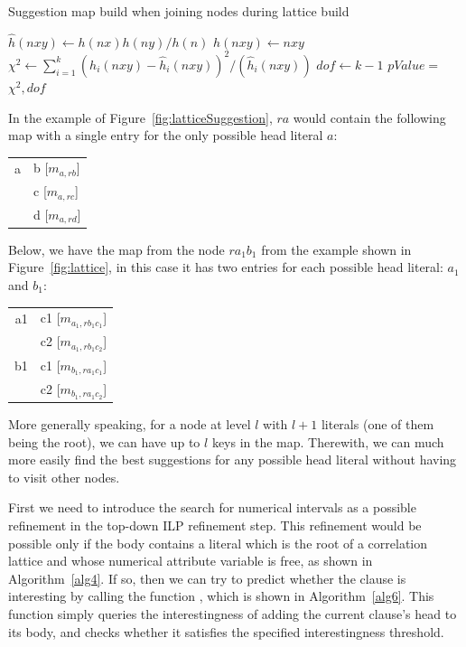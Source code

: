 \begin{algorithm}[h!]
 \caption{Suggestion map build when joining nodes during lattice build}
  $\hat{h}(nxy) \leftarrow h(nx)h(ny)/h(n)$\;
  $h(nxy) \leftarrow $$nxy$\FuncSty{)}\;
  $\chi^2 \leftarrow \sum_{i=1}^{k}(h_i(nxy)-\hat{h}_i(nxy))^2/(\hat{h}_i(nxy))$\;
  $dof \leftarrow k-1$\;
  $pValue = $$\chi^2,dof$\FuncSty{)}\;
 \label{alg:buildmaps}
\end{algorithm}

In the example of Figure~\ref{fig:latticeSuggestion}, $ra$ would contain the following map with a single entry for the
only possible head literal $a$:

\begin{center}
  \begin{tabular}{r | l}
    a & b [$m_{a,rb}$] \\
      & c [$m_{a,rc}$] \\
      & d [$m_{a,rd}$]
  \end{tabular}
\end{center}

Below, we have the map from the node $ra_1b_1$ from the example shown in Figure~\ref{fig:lattice}, in this case it has
two entries for each possible head literal: $a_1$ and $b_1$: 

\begin{center}
  \begin{tabular}{r | l}
    a1 	& c1 [$m_{a_1,rb_1c_1}$] \\
	& c2 [$m_{a_1,rb_1c_2}$] \\
    \hline
    b1	& c1 [$m_{b_1,ra_1c_1}$] \\
	& c2 [$m_{b_1,ra_1c_2}$]
  \end{tabular}
\end{center}

More generally speaking, for a node at level $l$ with $l+1$ literals (one of them being the root), we can have up to $l$
keys in the map. Therewith, we can much more easily find the best suggestions for any possible head literal without
having to visit other nodes.

First we need to introduce the search for numerical intervals as a possible refinement in the top-down ILP refinement
step. This refinement would be possible only if the body contains a literal which is the root of a correlation
lattice and whose numerical attribute variable is free, as shown in Algorithm~\ref{alg4}. If so, then we can try to
predict whether the clause is interesting by calling the function , which is shown
in Algorithm~\ref{alg6}. This function simply queries the interestingness of adding the current clause's head to its
body, and checks whether it satisfies the specified interestingness threshold.


